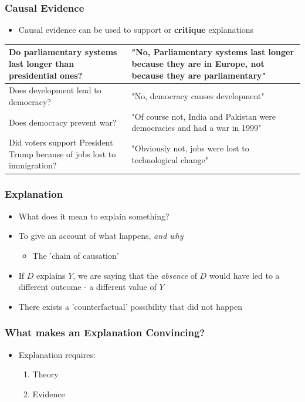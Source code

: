 \documentclass[xcolor=x11names,compress]{beamer}\usepackage[]{graphicx}\usepackage[]{xcolor}
\renewcommand{\(}{\begin{columns}}
\renewcommand{\)}{\end{columns}}
\newcommand{\<}[1]{\begin{column}{#1}}
\renewcommand{\>}{\end{column}}
\begin{document}
\begin{frame}
\frametitle{Causal Evidence}
\begin{itemize}
\item Causal evidence can be used to support or \textbf{critique} explanations
\end{itemize}
\pause
\begin{table}[htbp]
  \centering
    \begin{tabular}{|>{\raggedright}p{5cm}|p{5cm}|}
    \hline
    Do parliamentary systems last longer than presidential ones? & "No, Parliamentary systems last longer because they are in Europe, not because they are parliamentary" \pause \\
    \hline
    Does development lead to democracy? & "No, democracy causes development" \pause \\
    \hline
    Does democracy prevent war? & "Of course not, India and Pakistan were democracies and had a war in 1999" \pause \\
    \hline
    Did voters support President Trump because of jobs lost to immigration? & "Obviously not, jobs were lost to technological change" \\
    \hline
    \end{tabular}%
  \label{tab:addlabel}%
\end{table}%
\end{frame}

\begin{frame}
\frametitle{Explanation}
\begin{itemize}
\item What does it mean to explain something?
\pause
\item To give an account of what happens, \textit{and why}
\begin{itemize}
\item The 'chain of causation'
\pause
\end{itemize}
\item If $D$ explains $Y$, we are saying that the \textit{absence} of $D$ would have led to a different outcome - a different value of $Y$
\pause
\item There exists a 'counterfactual' possibility that did not happen
\end{itemize}
\end{frame}

\begin{frame}
\frametitle{What makes an Explanation Convincing?}
\begin{itemize}
\item  Explanation requires:
\begin{enumerate}
\item  Theory
\item  Evidence
\end{enumerate}
\end{itemize}
\end{frame}
\end{document}
